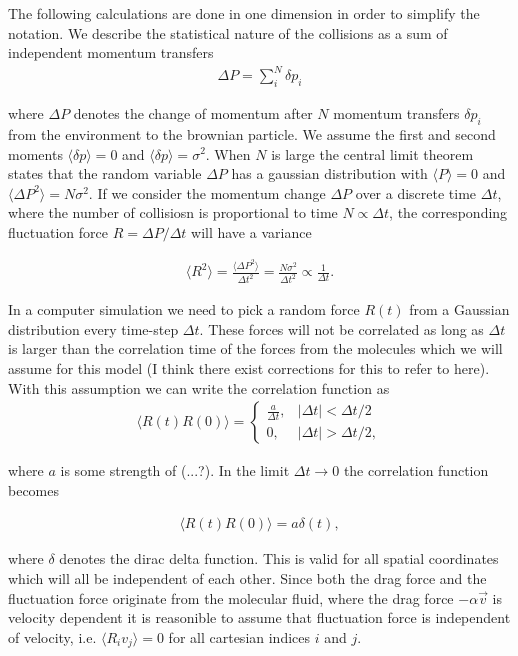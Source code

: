 The following calculations are done in one dimension in order to simplify the
notation. We describe the statistical nature of the collisions as a sum of
independent momentum transfers
\begin{align*}
  \Delta P = \sum_i^N \delta p_i
\end{align*}

where $\Delta P$ denotes the change of momentum after $N$ momentum transfers
$\delta p_i$ from the environment to the brownian particle. We assume the first
and second moments $\langle \delta p \rangle = 0$ and  $\langle \delta p \rangle
= \sigma^2$. When $N$ is large the central limit theorem states that the random
variable $\Delta P$ has a gaussian distribution with  $\langle P \rangle = 0$
and $\langle \Delta P^2 \rangle = N\sigma^2$. If we consider the momentum change
$\Delta P$  over a discrete time $\Delta t$, where the number of collisiosn is
proportional to time $N \propto \Delta t$, the corresponding fluctuation force
$R = \Delta P / \Delta t$ will have a variance 


\begin{align*}
  \langle R^2 \rangle = \frac{\langle \Delta P^2 \rangle}{\Delta t^2} = \frac{N \sigma^2}{\Delta t^2}  \propto \frac{1}{\Delta t}.
\end{align*}

In a computer simulation we need to pick a random force $R(t)$ from a Gaussian
distribution every time-step $\Delta t$. These forces will not be correlated as
long as $\Delta t$ is larger than the correlation time of the forces from the
molecules which we will assume for this model (I think there exist corrections
for this to refer to here). With this assumption we can write the correlation
function as 
\begin{align}
  \langle R(t) R(0) \rangle = 
  \begin{cases}
    \frac{a}{\Delta t}, & |\Delta t| < \Delta t/2 \\
    0, & |\Delta t| > \Delta t/2,
    \label{eq:disc_corr}
  \end{cases}
\end{align}

where $a$ is some strength of (...?). In the limit $\Delta t \to 0$ the
correlation function becomes

\begin{align}
  \langle R(t)R(0) \rangle = a \delta(t),
  \label{eq:F_corr}
\end{align}

where $\delta$ denotes the dirac delta function. This is valid for all spatial
coordinates which will all be independent of each other. Since both the drag
force and the fluctuation force originate from the molecular fluid, where the
drag force $-\alpha \vec{v}$ is velocity dependent it is reasonible to assume
that fluctuation force is independent of velocity, i.e. $\langle R_i v_j \rangle
= 0$ for all cartesian indices $i$ and $j$.



